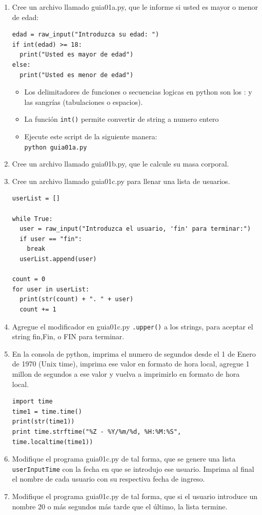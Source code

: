 \documentclass[10pt,letterpaper]{article}
\begin{document}
\begin{enumerate}
\item Cree un archivo llamado guia01a.py, que le informe si usted es mayor o menor de edad:
\begin{verbatim}
edad = raw_input("Introduzca su edad: ")
if int(edad) >= 18:
  print("Usted es mayor de edad")
else:
  print("Usted es menor de edad")
\end{verbatim}
\begin{itemize}
\item Los delimitadores de funciones o secuencias logicas en python son los : y las sangrías (tabulaciones o espacios). 
\item La función \verb|int()| permite convertir de string a numero entero
\item Ejecute este script de la siguiente manera: \\
\verb|python guia01a.py|
\end{itemize}

\item Cree un archivo llamado guia01b.py, que le calcule su masa corporal.

\item Cree un archivo llamado guia01c.py para llenar una lista de usuarios.
\begin{verbatim}
userList = []

while True:
  user = raw_input("Introduzca el usuario, 'fin' para terminar:")
  if user == "fin":
    break
  userList.append(user)

count = 0
for user in userList:
  print(str(count) + ". " + user)
  count += 1
\end{verbatim}

\item Agregue el modificador en guia01c.py \verb|.upper()| a los strings, para aceptar el string fin,Fin, o FIN para terminar.

\item En la consola de python, imprima el numero de segundos desde el 1 de Enero de 1970 (Unix time), imprima ese valor en formato de hora local, agregue 1 millon de segundos a ese valor y vuelva a imprimirlo en formato de hora local.
\begin{verbatim}
import time
time1 = time.time()
print(str(time1))
print time.strftime("%Z - %Y/%m/%d, %H:%M:%S", time.localtime(time1))
\end{verbatim}

\item Modifique el programa guia01c.py de tal forma, que se genere una lista \verb|userInputTime| con la fecha en que se introdujo ese usuario. Imprima al final el nombre de cada usuario con su respectiva fecha de ingreso.

\item Modifique el programa guia01c.py de tal forma, que si el usuario introduce un nombre 20 o más segundos más tarde que el último, la lista termine.


\end{enumerate}
\end{document}
